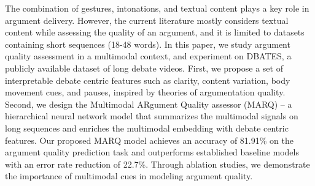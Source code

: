 The combination of gestures, intonations, and textual content plays a key role in argument delivery. However, the current literature mostly considers textual content while assessing the quality of an argument, and it is limited to datasets containing short sequences (18-48 words). In this paper, we study argument quality assessment in a multimodal context, and experiment on DBATES, a publicly available dataset of long debate videos. First, we propose a set of interpretable debate centric features such as clarity, content variation, body movement cues, and pauses, inspired by theories of argumentation quality. Second, we design the Multimodal ARgument Quality assessor (MARQ) -- a hierarchical neural network model that summarizes the multimodal signals on long sequences and enriches the multimodal embedding with debate centric features. Our proposed MARQ model achieves an accuracy of 81.91\% on the argument quality prediction task and outperforms established baseline models with an error rate reduction of 22.7\%. Through ablation studies, we demonstrate the importance of multimodal cues in modeling argument quality.

